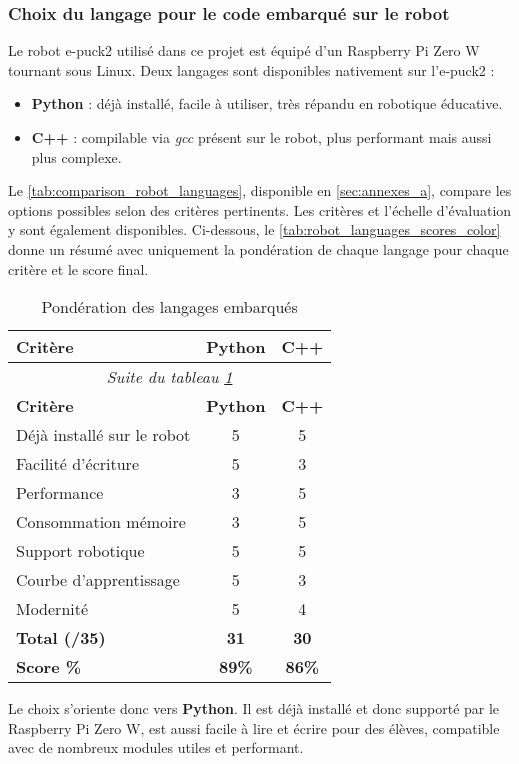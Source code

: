 \subsubsection{Choix du langage pour le code embarqué sur le robot} \label{sec:robot_code}

Le robot e-puck2 utilisé dans ce projet est équipé d’un Raspberry Pi Zero W tournant sous Linux.
Deux langages sont disponibles nativement sur l’e‑puck2 :
\begin{itemize}
  \item \textbf{Python} : déjà installé, facile à utiliser, très répandu en robotique éducative.
  \item \textbf{C++} : compilable via \textit{gcc} présent sur le robot, plus performant mais aussi plus complexe.
\end{itemize}

Le \autoref{tab:comparison_robot_languages}, disponible en \autoref{sec:annexes_a}, compare les options possibles selon des critères pertinents.
Les critères et l'échelle d'évaluation y sont également disponibles.
Ci-dessous, le \autoref{tab:robot_languages_scores_color} donne un résumé avec uniquement la pondération de chaque langage pour chaque critère et le score final.

\begin{longtable}[H]{|p{}|c|c|}
\caption{\label{tab:robot_languages_scores_color} Pondération des langages embarqués} \\

\hline
\textbf{Critère} & \textbf{Python} & \textbf{C++} \\
\hline
\endfirsthead

\multicolumn{3}{c}{\textit{Suite du tableau \ref{tab:robot_languages_scores_color}}} \\
\hline
\textbf{Critère} & \textbf{Python} & \textbf{C++} \\
\hline
\endhead

Déjà installé sur le robot       & \cellcolor{green!20}5 & \cellcolor{green!20}5 \\
Facilité d’écriture              & \cellcolor{green!20}5 & \cellcolor{yellow!30}3 \\
Performance                      & \cellcolor{yellow!30}3 & \cellcolor{green!20}5 \\
Consommation mémoire             & \cellcolor{yellow!30}3 & \cellcolor{green!20}5 \\
Support robotique                & \cellcolor{green!20}5 & \cellcolor{green!20}5 \\
Courbe d’apprentissage           & \cellcolor{green!20}5 & \cellcolor{yellow!30}3 \\
Modernité                        & \cellcolor{green!20}5 & \cellcolor{blue!15}4 \\
\hline
\textbf{Total (/35)}             & \cellcolor{green!25}\textbf{31} & \cellcolor{green!20}\textbf{30} \\
\hline
\textbf{Score \%}                & \cellcolor{green!25}\textbf{89\%} & \cellcolor{green!20}\textbf{86\%} \\
\hline

\end{longtable}

Le choix s’oriente donc vers \textbf{Python}.
Il est déjà installé et donc supporté par le Raspberry Pi Zero W, est aussi facile à lire et écrire pour des élèves, compatible avec de nombreux modules utiles et performant.
